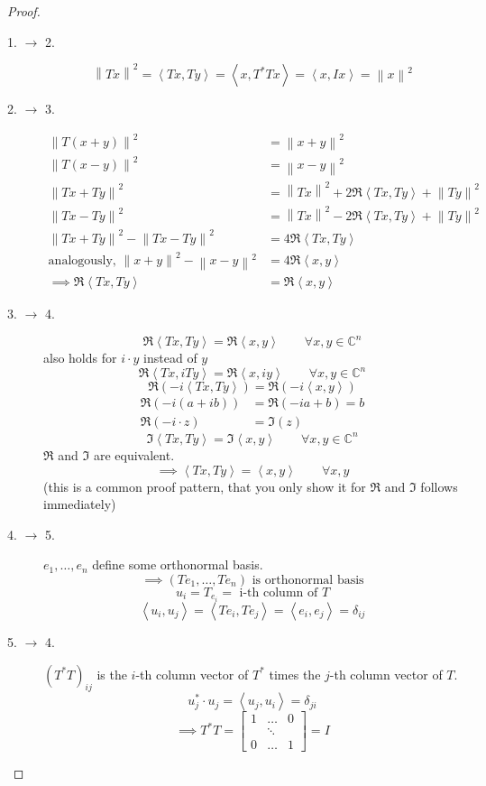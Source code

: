 \documentclass{article}
\newcommand{\ip}[2]{\left\langle#1,#2\right\rangle} %
\newcommand{\norm}[1]{\left\|#1\right\|}
\begin{document}
\begin{proof}
  \begin{description}
    \item[1. $\to$ 2.]
      \[ \norm{Tx}^2 = \ip{Tx}{Ty} = \ip{x}{T^*Tx} = \ip{x}{Ix} = \norm{x}^2 \]
    \item[2. $\to$ 3.]
      \begin{align*}
        \norm{T(x+y)}^2 &= \norm{x+y}^2 \\
        \norm{T(x-y)}^2 &= \norm{x-y}^2 \\
        \norm{Tx + Ty}^2 &= \norm{Tx}^2 + 2\Re{\ip{Tx}{Ty}} + \norm{Ty}^2 \\
        \norm{Tx - Ty}^2 &= \norm{Tx}^2 - 2\Re{\ip{Tx}{Ty}} + \norm{Ty}^2  \\
      \hline
        \norm{Tx + Ty}^2 - \norm{Tx - Ty}^2 &= 4\Re{\ip{Tx}{Ty}} \\
        \text{analogously, } \norm{x + y}^2 - \norm{x - y}^2 &= 4\Re{\ip xy} \\
      \hline
        \implies \Re{\ip{Tx}{Ty}} &= \Re{\ip xy}
      \end{align*}
    \item[3. $\to$ 4.]
      \[ \Re{\ip{Tx}{Ty}} = \Re{\ip xy} \qquad \forall x,y \in \mathbb C^{n} \]
      also holds for $i \cdot y$ instead of $y$
      \[ \Re{\ip{Tx}{iTy}} = \Re{\ip{x}{iy}} \qquad \forall x,y \in \mathbb C^n \]
      \[ \Re\left(-i \ip{Tx}{Ty}\right) = \Re(-i \ip xy) \]
      \begin{align*}
        \Re(-i(a + ib)) &= \Re(-ia + b) = b \\
        \Re(-i \cdot z) &= \Im({z})
      \end{align*}
      \[ \Im{\ip{Tx}{Ty}} = \Im{\ip{x}{y}} \qquad \forall x,y \in \mathbb C^n \]
      $\Re$ and $\Im$ are equivalent.
      \[ \implies \ip{Tx}{Ty} = \ip xy \qquad \forall x,y \]
      (this is a common proof pattern, that you only show it for $\Re$ and $\Im$ follows immediately)
    \item[4. $\to$ 5.]
      $e_1, \dots, e_n$ define some orthonormal basis.
      \[ \implies (Te_1, \dots, Te_n) \text{ is orthonormal basis} \]
      \[ u_i = T_{e_i} = \text{ i-th column of } T \]
      \[ \ip{u_i}{u_j} = \ip{Te_i}{Te_j} = \ip{e_i}{e_j} = \delta_{ij} \]
    \item[5. $\to$ 4.]
      $(T^* T)_{ij}$ is the $i$-th column vector of $T^*$ times the $j$-th column vector of $T$.
      \[ u_j^* \cdot u_j = \ip{u_j}{u_i} = \delta_{ji} \]
      \[
        \implies T^* T = \begin{bmatrix}
          1 & \dots & 0 \\
            & \ddots & \\
          0 & \dots & 1
        \end{bmatrix}
        = I
      \]
  \end{description}
\end{proof}
\end{document}
